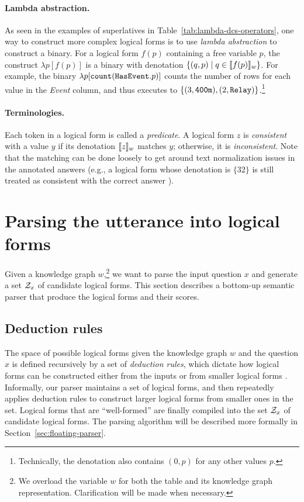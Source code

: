 \paragraph{Lambda abstraction.}
As seen in the examples of superlatives in
Table~\ref{tab:lambda-dcs-operators},
one way to construct more complex logical forms
is to use \emph{lambda abstraction}
to construct a binary.
For a logical form $f(p)$ containing a free variable $p$,
the construct $\lambda p[f(p)]$
is a binary with denotation
$\{(q, p) \mid q \in \llbracket{f(p)}\rrbracket_{w} \}$.
For example, the binary
$\lambda p[\texttt{count}(\texttt{Has}{\texttt{Event}}.p)]$
counts the number of rows for each value in the \emph{Event}
column, and thus executes to
$\{(3, \texttt{400m}), (2, \texttt{Relay})\}$.\footnote{
Technically, the denotation also contains
$(0, p)$ for any other values $p$.}

\paragraph{Terminologies.}
Each token in a logical form is called a \emph{predicate}.
A logical form $z$ is \emph{consistent} with a value $y$
if its denotation $\llbracket{z}\rrbracket_{w}$ matches $y$;
otherwise, it is \emph{inconsistent}.
Note that the matching can be done loosely to
get around text normalization issues
in the annotated answers
(e.g., a logical form whose denotation is $\{32\}$
is still treated as consistent with
the correct answer ).


\section{Parsing the utterance into logical forms}
\label{sec:sempre-parsing}

Given a knowledge graph $w$,\footnote{
We overload the variable $w$ for both the table and
its knowledge graph representation.
Clarification will be made when necessary.}
we want to parse the input question $x$
and generate a set $\mathcal{Z}_x$ of candidate logical forms.
This section describes a bottom-up semantic parser
that produce the logical forms and their scores.

\subsection{Deduction rules}
The space of possible logical forms given the knowledge graph $w$
and the question $x$ is defined recursively
by a set of \emph{deduction rules},
which dictate how logical forms
can be constructed either from the inputs
or from smaller logical forms
\cite{zettlemoyer07relaxed,berant2013freebase}.
Informally,
our parser
maintains a set of logical forms,
and then repeatedly applies deduction rules
to construct larger logical forms
from smaller ones in the set.
Logical forms that are ``well-formed''
are finally compiled into
the set $\mathcal{Z}_x$ of candidate logical forms.
The parsing algorithm will be described more formally
in Section~\ref{sec:floating-parser}.

